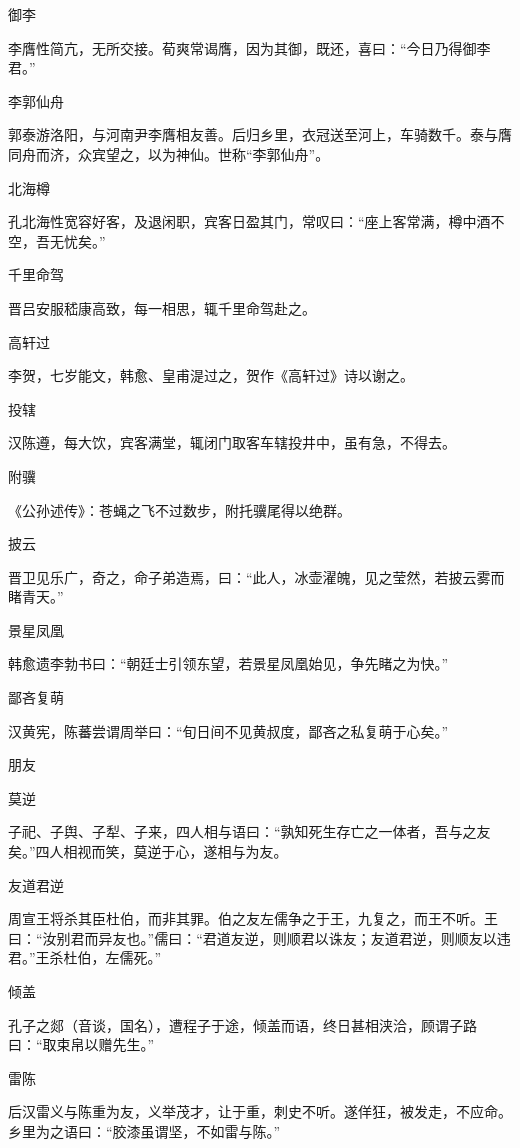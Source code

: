 \documentclass[a4paper,12pt,UTF8,twoside]{ctexbook}
\begin{document}
    御李
    
    李膺性简亢，无所交接。荀爽常谒膺，因为其御，既还，喜曰：“今日乃得御李君。”
    
    李郭仙舟
    
    郭泰游洛阳，与河南尹李膺相友善。后归乡里，衣冠送至河上，车骑数千。泰与膺同舟而济，众宾望之，以为神仙。世称“李郭仙舟”。
    
    北海樽
    
    孔北海性宽容好客，及退闲职，宾客日盈其门，常叹曰：“座上客常满，樽中酒不空，吾无忧矣。”
    
    千里命驾
    
    晋吕安服嵇康高致，每一相思，辄千里命驾赴之。
    
    高轩过
    
    李贺，七岁能文，韩愈、皇甫湜过之，贺作《高轩过》诗以谢之。
    
    投辖
    
    汉陈遵，每大饮，宾客满堂，辄闭门取客车辖投井中，虽有急，不得去。
    
    附骥
    
    《公孙述传》：苍蝇之飞不过数步，附托骥尾得以绝群。
    
    披云
    
    晋卫见乐广，奇之，命子弟造焉，曰：“此人，冰壶濯魄，见之莹然，若披云雾而睹青天。”
    
    景星凤凰
    
    韩愈遗李勃书曰：“朝廷士引领东望，若景星凤凰始见，争先睹之为快。”
    
    鄙吝复萌
    
    汉黄宪，陈蕃尝谓周举曰：“旬日间不见黄叔度，鄙吝之私复萌于心矣。”
    
    朋友
    
    莫逆
    
    子祀、子舆、子犁、子来，四人相与语曰：“孰知死生存亡之一体者，吾与之友矣。”四人相视而笑，莫逆于心，遂相与为友。
    
    友道君逆
    
    周宣王将杀其臣杜伯，而非其罪。伯之友左儒争之于王，九复之，而王不听。王曰：“汝别君而异友也。”儒曰：“君道友逆，则顺君以诛友；友道君逆，则顺友以违君。”王杀杜伯，左儒死。”
    
    倾盖
    
    孔子之郯（音谈，国名），遭程子于途，倾盖而语，终日甚相浃洽，顾谓子路曰：“取束帛以赠先生。”
    
    雷陈
    
    后汉雷义与陈重为友，义举茂才，让于重，刺史不听。遂佯狂，被发走，不应命。乡里为之语曰：“胶漆虽谓坚，不如雷与陈。”
    
\end{document}
